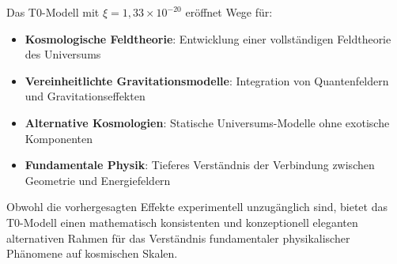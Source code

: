 \documentclass[12pt,a4paper]{article}
\theoremstyle{definition}
\begin{document}
	Das T0-Modell mit $\xi = 1{,}33 \times 10^{-20}$ er\"offnet Wege f\"ur:
	
	\begin{itemize}
		\item \textbf{Kosmologische Feldtheorie}: Entwicklung einer vollst\"andigen Feldtheorie des Universums
		\item \textbf{Vereinheitlichte Gravitationsmodelle}: Integration von Quantenfeldern und Gravitationseffekten
		\item \textbf{Alternative Kosmologien}: Statische Universums-Modelle ohne exotische Komponenten
		\item \textbf{Fundamentale Physik}: Tieferes Verst\"andnis der Verbindung zwischen Geometrie und Energiefeldern
	\end{itemize}
	
	Obwohl die vorhergesagten Effekte experimentell unzugänglich sind, bietet das T0-Modell einen mathematisch konsistenten und konzeptionell eleganten alternativen Rahmen f\"ur das Verst\"andnis fundamentaler physikalischer Ph\"anomene auf kosmischen Skalen.
	
\end{document}
